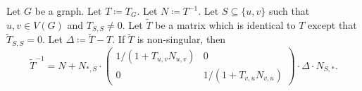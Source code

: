 \begin{theorem}
\label{thm:rank-two}
    Let \(G\) be a graph. 
    Let \(T \coloneqq T_G\). 
    Let \(N \coloneqq T^{-1}\).
    Let \(S \subseteq \{u, v\}\) such that \(u, v \in V(G)\) and \(T_{S, S} \neq 0\).
    Let \(\tilde{T}\) be a matrix which is identical to \(T\) except that \(\tilde{T}_{S, S} = 0\).
    Let \(\Delta \coloneqq \tilde{T} - T\).
    If \(\tilde{T}\) is non-singular, then
    \[
        \tilde{T}^{-1} = N + N_{*, S} \cdot 
        \begin{pmatrix}
            1 / (1 + T_{u, v}N_{u, v}) & 0 \\
            0 &  1 / (1 + T_{v, u}N_{v, u})
        \end{pmatrix}
        \cdot \Delta \cdot N_{S, *}.
    \]
\end{theorem}

